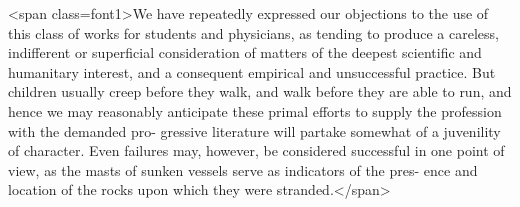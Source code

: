 <span class=font1>We have repeatedly expressed our objections to the use of this class
of works for students and physicians, as tending to produce a careless,
indifferent or superficial consideration of matters of the deepest scientific
and humanitary interest, and a consequent empirical and unsuccessful
practice. But children usually creep before they walk, and walk
before they are able to run, and hence we may reasonably anticipate
these primal efforts to supply the profession with the demanded pro-
gressive literature will partake somewhat of a juvenility of character.
Even failures may, however, be considered successful in one point of
view, as the masts of sunken vessels serve as indicators of the pres-
ence and location of the rocks upon which they were stranded.</span>\endinput
